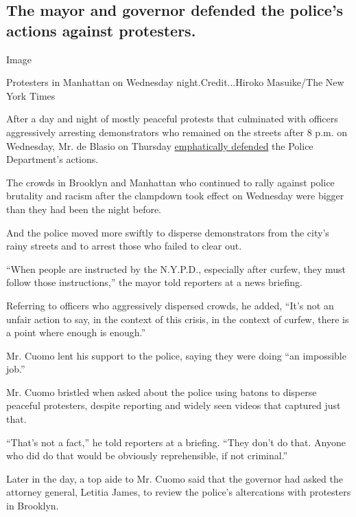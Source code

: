 \hypertarget{the-mayor-and-governor-defended-the-polices-actions-against-protesters}{%
\subsection{The mayor and governor defended the police's actions against
protesters.}\label{the-mayor-and-governor-defended-the-polices-actions-against-protesters}}

Image

Protesters in Manhattan on Wednesday night.Credit...Hiroko Masuike/The
New York Times

After a day and night of mostly peaceful protests that culminated with
officers aggressively arresting demonstrators who remained on the
streets after 8 p.m. on Wednesday, Mr. de Blasio on Thursday
\href{https://www.nytimes3xbfgragh.onion/2020/06/04/nyregion/De-blasio-protests-curfew.html}{emphatically
defended} the Police Department's actions.

The crowds in Brooklyn and Manhattan who continued to rally against
police brutality and racism after the clampdown took effect on Wednesday
were bigger than they had been the night before.

And the police moved more swiftly to disperse demonstrators from the
city's rainy streets and to arrest those who failed to clear out.

``When people are instructed by the N.Y.P.D., especially after curfew,
they must follow those instructions,'' the mayor told reporters at a
news briefing.

Referring to officers who aggressively dispersed crowds, he added,
``It's not an unfair action to say, in the context of this crisis, in
the context of curfew, there is a point where enough is enough.''

Mr. Cuomo lent his support to the police, saying they were doing ``an
impossible job.''

Mr. Cuomo bristled when asked about the police using batons to disperse
peaceful protesters, despite reporting and widely seen videos that
captured just that.

``That's not a fact,'' he told reporters at a briefing. ``They don't do
that. Anyone who did do that would be obviously reprehensible, if not
criminal.''

Later in the day, a top aide to Mr. Cuomo said that the governor had
asked the attorney general, Letitia James, to review the police's
altercations with protesters in Brooklyn.

